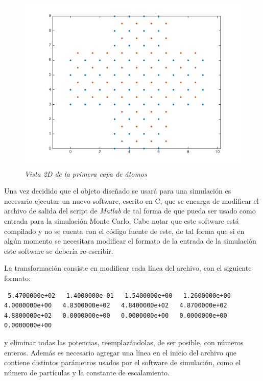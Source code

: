 \begin{figure}[ht]
  \centering
  \includegraphics[scale=.6]{images/procesoActualMatlab2}
  \caption{\em Vista 2D de la primera capa de átomos}
  \label{procesoActualMatlab2}
\end{figure}

Una vez decidido que el objeto diseñado se usará para una simulación es necesario ejecutar un nuevo software, escrito en C, que se encarga de modificar el archivo de salida del script de \emph{Matlab} de tal forma de que pueda ser usado como entrada para la simulación Monte Carlo. Cabe notar que este software está compilado y no se cuenta con el código fuente de este, de tal forma que si en algún momento se necesitara modificar el formato de la entrada de la simulación este software se debería re-escribir.

La transformación consiste en modificar cada línea del archivo, con el siguiente formato:

\begin{center}
	\begin{lstlisting}
 5.4700000e+02   1.4000000e-01   1.5400000e+00   1.2600000e+00   4.0000000e+00   4.8300000e+02   4.8400000e+02   4.8700000e+02   4.8800000e+02   0.0000000e+00   0.0000000e+00   0.0000000e+00   0.0000000e+00
	\end{lstlisting}
\end{center}

\noindent
y eliminar todas las potencias, reemplazándolas, de ser posible, con números enteros. Además es necesario agregar una línea en el inicio del archivo que contiene distintos parámetros usados por el software de simulación, como el número de partículas y la constante de escalamiento.

